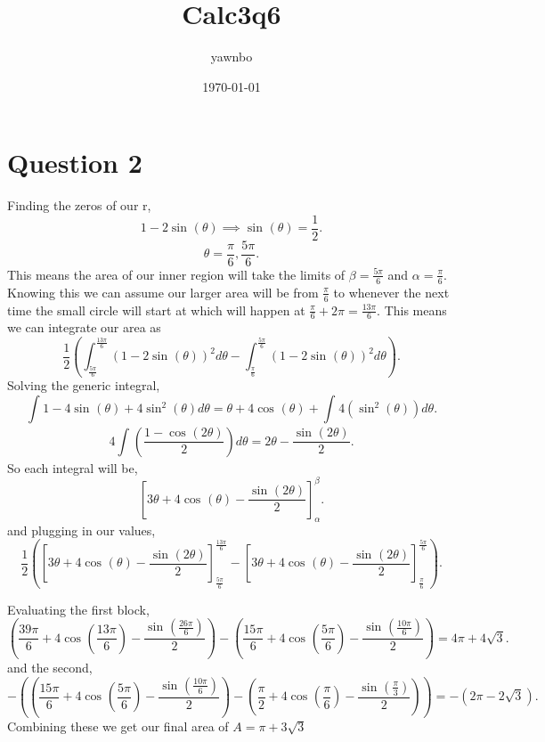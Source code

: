 \documentclass{report}
\title{\Huge{Calc3q6}\\  }
\author{\huge{yawnbo}}
\date{\today}
\begin{document}
\maketitle
\newpage%

\pagebreak
\section{Question 2}%
\label{sec:Question 2}
Finding the zeros of our r,
\[
1-2\sin^{  } \left( \theta \right) \implies \sin^{  } \left( \theta \right) =\frac{ 1 }{ 2 } 
.\] 
\[
\theta = \frac{ \pi }{ 6 } ,\frac{ 5\pi }{ 6 }
.\] 
This means the area of our inner region will take the limits of $ \beta=\frac{ 5\pi }{ 6 }  $ and $ \alpha = \frac{ \pi }{ 6 }  $. Knowing this we can assume our larger area will be from $ \frac{ \pi }{ 6 }  $ to whenever the next time the small circle will start at which will happen at $ \frac{ \pi }{ 6 } +2\pi = \frac{ 13\pi }{ 6 }  $. This means we can integrate our area as 
\[
\frac{ 1 }{ 2 } \left( \int_{ \frac{ 5\pi }{ 6 }  }^{ \frac{ 13\pi }{ 6 }  } \left( 1-2\sin^{  } \left( \theta \right)  \right) ^2d\theta - \int_{ \frac{ \pi }{ 6 }  }^{ \frac{ 5\pi }{ 6 }  } \left( 1-2\sin^{  } \left( \theta \right)  \right) ^2d\theta \right)
.\] 
Solving the generic integral,
\[
\int_{  }^{  } 1 - 4\sin^{  } \left( \theta \right) +4\sin^{ 2 } \left( \theta \right) d\theta = \theta + 4\cos^{  } \left( \theta \right) + \int_{  }^{  } 4\left( \sin^{ 2 } \left( \theta \right)  \right) d\theta
.\] 
\[
4 \int_{  }^{  } \left( \frac{ 1-\cos^{  } \left( 2\theta \right)  }{ 2 } \right) d\theta = 2\theta - \frac{ \sin^{  } \left( 2\theta \right) }{ 2 } 
.\] 
So each integral will be,
\[
\left[ 3\theta + 4\cos^{  } \left( \theta \right) - \frac{ \sin^{  } \left( 2\theta \right)  }{ 2 }\right]_{ \alpha }^{ \beta }
.\] 
and plugging in our values,
\[
\frac{ 1 }{ 2 } \left( \left[ 3\theta + 4\cos^{  } \left( \theta \right) -\frac{ \sin^{  } \left( 2\theta \right)  }{ 2 } \right]_{ \frac{ 5\pi }{ 6 } }^{ \frac{ 13\pi }{ 6 } } - \left[ 3\theta + 4\cos^{  } \left( \theta \right) -\frac{ \sin^{  } \left( 2\theta \right) }{ 2 }  \right]_{ \frac{ \pi }{ 6 }  }^{ \frac{ 5\pi }{ 6 } }\right)
.\] 

Evaluating the first block,
\[
	\left( \frac{ 39\pi }{ 6 } + 4\cos^{  } \left( \frac{ 13\pi }{ 6 }  \right) - \frac{ \sin^{  } \left( \frac{ 26\pi }{ 6 }  \right) }{ 2 }  \right) - \left( \frac{ 15\pi }{ 6 } + 4\cos^{  } \left( \frac{ 5\pi }{ 6 }  \right) - \frac{ \sin^{  } \left( \frac{ 10\pi }{ 6 }  \right) }{ 2 }  \right) = 4\pi + 4\sqrt{ 3 } 
.\] 
and the second,
\[
-\left(  \left( \frac{ 15\pi }{ 6 } + 4\cos^{  } \left( \frac{ 5\pi }{ 6 }  \right) - \frac{ \sin^{  } \left( \frac{ 10\pi }{ 6 }  \right) }{ 2 }  \right) - \left( \frac{ \pi }{ 2 } +4\cos^{  } \left( \frac{ \pi }{ 6 }  \right) - \frac{ \sin^{  } \left( \frac{ \pi }{ 3 } \right) }{ 2 }  \right) \right) = -\left( 2\pi - 2\sqrt{ 3 }  \right) 
.\] 
Combining these we get our final area of $ A = \pi + 3\sqrt{ 3 } $ 
\end{document}
